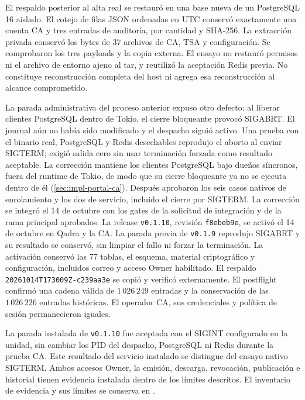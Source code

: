 El respaldo posterior al alta real se restaur\'o en una base nueva de un
PostgreSQL 16 aislado. El cotejo de filas JSON ordenadas en UTC conserv\'o
exactamente una cuenta CA y tres entradas de auditor\'ia, por cantidad y SHA-256.
La extracci\'on privada conserv\'o los bytes de 37 archivos de CA, TSA y
configuraci\'on. Se comprobaron los tres payloads y la copia externa. El ensayo
no restaur\'o permisos ni el archivo de entorno ajeno al tar, y reutiliz\'o
la aceptaci\'on Redis previa. No constituye reconstrucci\'on completa del host
ni agrega esa reconstrucci\'on al alcance comprometido.

La parada administrativa del proceso anterior expuso otro defecto: al liberar
clientes PostgreSQL dentro de Tokio, el cierre bloqueante provoc\'o SIGABRT.
El journal a\'un no hab\'ia sido modificado y el despacho sigui\'o activo.
Una prueba con el binario real, PostgreSQL y Redis desechables reprodujo el
aborto al enviar SIGTERM; exigi\'o salida cero sin usar terminaci\'on forzada
como resultado aceptable. La correcci\'on mantiene los clientes PostgreSQL bajo due\~nos s\'incronos,
fuera del runtime de Tokio, de modo que su cierre bloqueante ya no se ejecuta
dentro de \'el (\cref{sec:impl-portal-ca}). Despu\'es
aprobaron los seis casos nativos de enrolamiento y los dos de servicio,
incluido el cierre por SIGTERM. La correcci\'on se integr\'o el 14 de octubre
con los gates de la solicitud de integraci\'on y de la rama principal aprobados.
La release \texttt{v0.1.10}, revisi\'on \texttt{f8ebeb9e}, se activ\'o el
14 de octubre en Qadra y la CA. La parada previa de \texttt{v0.1.9} reprodujo
SIGABRT y su resultado se conserv\'o, sin limpiar el fallo ni forzar la
terminaci\'on. La activaci\'on conserv\'o las 77 tablas, el esquema, material
criptogr\'afico y configuraci\'on, incluidos correo y acceso Owner habilitado.
El respaldo \texttt{20261014T173009Z-c239aa3e} se copi\'o y verific\'o externamente.
El postflight confirm\'o una cadena v\'alida de $1\,026\,249$ entradas y la
conservaci\'on de las $1\,026\,226$ entradas hist\'oricas. El operador CA,
sus credenciales y pol\'itica de sesi\'on permanecieron iguales.

La parada instalada de \texttt{v0.1.10} fue aceptada con el SIGINT configurado
en la unidad, sin cambiar los PID del despacho, PostgreSQL ni Redis durante
la prueba CA. Este resultado del servicio instalado se distingue del ensayo
nativo SIGTERM. Ambos accesos Owner, la emisi\'on, descarga, revocaci\'on,
publicaci\'on e historial tienen evidencia instalada dentro de los l\'imites
descritos.
El inventario de evidencia y sus l\'imites se conserva en
.
